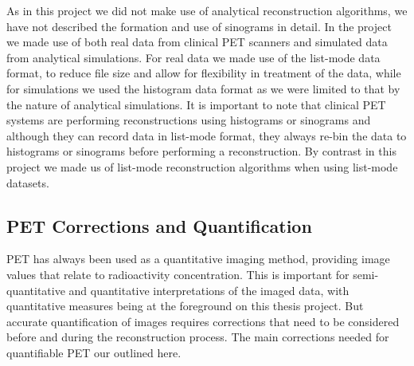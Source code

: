 As in this project we did not make use of analytical reconstruction algorithms, we have not described the formation and use of sinograms in detail. 
In the project we made use of both real data from clinical PET scanners and simulated data from analytical simulations. For real data we made use of the list-mode data format, to reduce file size and allow for flexibility in treatment of the data, while for simulations we used the histogram data format as we were limited to that by the nature of analytical simulations.
It is important to note that clinical PET systems are performing reconstructions using histograms or sinograms and although they can record data in list-mode format, they always re-bin the data to histograms or sinograms before performing a reconstruction. 
By contrast in this project we made us of list-mode reconstruction algorithms when using list-mode datasets.

\subsection{PET Corrections and Quantification}
PET has always been used as a quantitative imaging method, providing image values that relate to radioactivity concentration. This is important for semi-quantitative and quantitative interpretations of the imaged data, with quantitative measures being at the foreground on this thesis project.
But accurate quantification of images requires corrections that need to be considered before and during the reconstruction process. The main corrections needed for quantifiable PET our outlined here.


